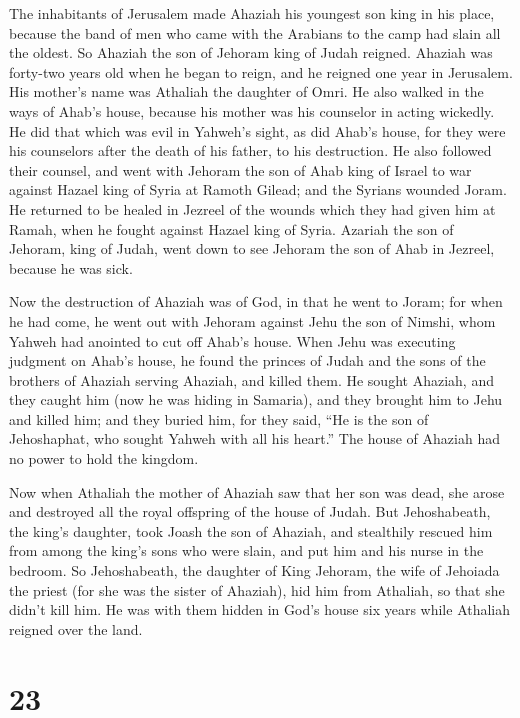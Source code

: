  The inhabitants of Jerusalem made Ahaziah his youngest
son king in his place, because the band of men who came with the
Arabians to the camp had slain all the oldest. So Ahaziah the son of
Jehoram king of Judah reigned.  Ahaziah was forty-two
years old when he began to reign, and he reigned one year in Jerusalem.
His mother's name was Athaliah the daughter of Omri.  He
also walked in the ways of Ahab's house, because his mother was his
counselor in acting wickedly.  He did that which was evil
in Yahweh's sight, as did Ahab's house, for they were his counselors
after the death of his father, to his destruction.  He
also followed their counsel, and went with Jehoram the son of Ahab king
of Israel to war against Hazael king of Syria at Ramoth Gilead; and the
Syrians wounded Joram.  He returned to be healed in
Jezreel of the wounds which they had given him at Ramah, when he fought
against Hazael king of Syria. Azariah the son of Jehoram, king of Judah,
went down to see Jehoram the son of Ahab in Jezreel, because he was
sick.

 Now the destruction of Ahaziah was of God, in that he
went to Joram; for when he had come, he went out with Jehoram against
Jehu the son of Nimshi, whom Yahweh had anointed to cut off Ahab's
house.  When Jehu was executing judgment on Ahab's house,
he found the princes of Judah and the sons of the brothers of Ahaziah
serving Ahaziah, and killed them.  He sought Ahaziah, and
they caught him (now he was hiding in Samaria), and they brought him to
Jehu and killed him; and they buried him, for they said, ``He is the son
of Jehoshaphat, who sought Yahweh with all his heart.'' The house of
Ahaziah had no power to hold the kingdom.

 Now when Athaliah the mother of Ahaziah saw that her son
was dead, she arose and destroyed all the royal offspring of the house
of Judah.  But Jehoshabeath, the king's daughter, took
Joash the son of Ahaziah, and stealthily rescued him from among the
king's sons who were slain, and put him and his nurse in the bedroom. So
Jehoshabeath, the daughter of King Jehoram, the wife of Jehoiada the
priest (for she was the sister of Ahaziah), hid him from Athaliah, so
that she didn't kill him.  He was with them hidden in
God's house six years while Athaliah reigned over the land.

\hypertarget{section-22}{%
\section{23}\label{section-22}}

